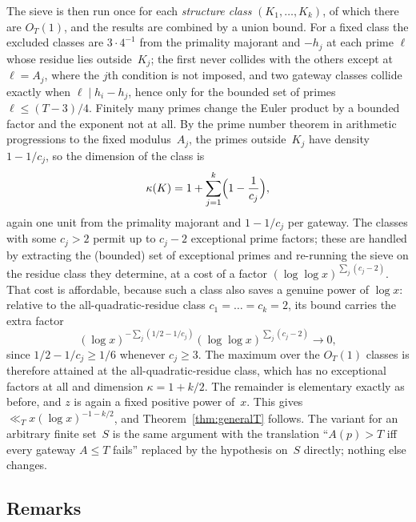 \documentclass[12pt]{amsart}
\theoremstyle{definition}
\theoremstyle{remark}
\begin{document}
The sieve is then run once for each \emph{structure class}
$(K_1,\dots,K_k)$, of which there are $O_T(1)$, and the results are
combined by a union bound.  For a fixed class the excluded classes are
$3 \cdot 4^{-1}$ from the primality majorant and $-h_j$ at each prime
$\ell$ whose residue lies outside~$K_j$; the first never collides with
the others except at $\ell = A_j$, where the $j$th condition is not
imposed, and two gateway classes collide exactly when
$\ell \mid h_i - h_j$, hence only for the bounded set of primes
$\ell \leq (T-3)/4$.  Finitely many primes change the Euler product by
a bounded factor and the exponent not at all.  By the prime number
theorem in arithmetic progressions to the fixed modulus~$A_j$, the
primes outside~$K_j$ have density $1 - 1/c_j$, so the dimension of the
class is
\[
  \kappa(K) = 1 + \sum_{j=1}^{k}\Bigl(1 - \frac{1}{c_j}\Bigr),
\]
again one unit from the primality majorant and $1 - 1/c_j$ per gateway.
The classes with some $c_j > 2$ permit up to $c_j - 2$ exceptional
prime factors; these are handled by extracting the (bounded) set of
exceptional primes and re-running the sieve on the residue class they
determine, at a cost of a factor $(\log\log x)^{\sum_j (c_j-2)}$.
That cost is affordable, because such a class also saves a genuine
power of $\log x$: relative to the all-quadratic-residue class
$c_1 = \dots = c_k = 2$, its bound carries the extra factor
\[
  (\log x)^{-\sum_j (1/2 - 1/c_j)} (\log\log x)^{\sum_j (c_j - 2)}
  \longrightarrow 0,
\]
since $1/2 - 1/c_j \geq 1/6$ whenever $c_j \geq 3$.  The maximum over
the $O_T(1)$ classes is therefore attained at the all-quadratic-residue
class, which has no exceptional factors at all and dimension
$\kappa = 1 + k/2$.  The remainder is elementary exactly as before,
and $z$ is again a fixed positive power of~$x$.  This gives
$\ll_T x(\log x)^{-1-k/2}$, and Theorem~\ref{thm:generalT} follows.
The variant for an arbitrary finite set~$S$ is the same argument with
the translation ``$A(p) > T$ iff every gateway $A \leq T$ fails''
replaced by the hypothesis on~$S$ directly; nothing else changes.

\subsection{Remarks}
\end{document}
